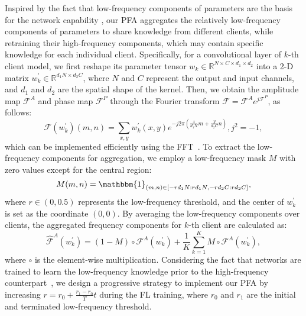 \documentclass[runningheads]{llncs}
\begin{document}
Inspired by the fact that low-frequency components of parameters are the basis for the network capability \cite{frequency_pruning}, our PFA aggregates the relatively low-frequency components of parameters to share knowledge from different clients, while retraining their high-frequency components, which may contain specific knowledge for each individual client. Specifically, for a convolutional layer of $k$-th client model, we first reshape its parameter tensor $w_{k}\in \mathbb{R}^{N\times C\times d_{1}\times d_{2}}$ into a 2-D matrix $w_{k}^{'}\in \mathbb{R}^{d_{1}N\times d_{2}C}$, where $N$ and $C$ represent the output and input channels, and $d_{1}$ and $d_{2}$ are the spatial shape of the kernel. Then, we obtain the amplitude map $\mathcal{F}^{A}$ and phase map $\mathcal{F}^{P}$ through the Fourier transform $\mathcal{F}=\mathcal{F}^{A}e^{j \mathcal{F}^{P}}$, as follows:
\begin{equation}
    \mathcal{F}(w_{k}^{'})(m, n)=\sum_{x, y} w_{k}^{'}(x, y) e^{-j 2 \pi\left(\frac{x}{d_{1}N} m+\frac{y}{d_{2}C} n\right)}, j^{2}=-1,
\end{equation}
which can be implemented efficiently using the FFT~\cite{fft}. To extract the low-frequency components for aggregation, we employ a low-frequency mask $M$ with zero values except for the central region:
\begin{equation}
    {M}(m, n)=\mathbbm{1}_{(m, n) \in[-rd_{1}N: rd_{1}N,-rd_{2}C: rd_{2}C]},
\end{equation}
where $r\in(0,0.5)$ represents the low-frequency threshold, and the center of $w_{k}^{'}$ is set as the coordinate $(0, 0)$. By averaging the low-frequency components over clients, the aggregated frequency components for $k$-th client are calculated as:
\setlength{\abovedisplayskip}{3pt}
\setlength{\belowdisplayskip}{3pt}
\begin{equation}
    \hat{\mathcal{F}}^{A}(w_{k}^{'})=(1-M) \circ \mathcal{F}^{A}(w_{k}^{'})+\frac{1}{K}\sum_{k=1}^{K}M \circ \mathcal{F}^{A}(w_{k}^{'}),
\end{equation}
where $\circ$ is the element-wise multiplication. Considering the fact that networks are trained to learn the low-frequency knowledge prior to the high-frequency counterpart~\cite{image_prior,xu2019training,rahaman2018spectral}, we design a progressive strategy to implement our PFA by increasing $r=r_{0}+\frac{r_{1}-r_{0}}{T}t$ during the FL training, where $r_{0}$ and $r_{1}$ are the initial and terminated low-frequency threshold. 
\end{document}

